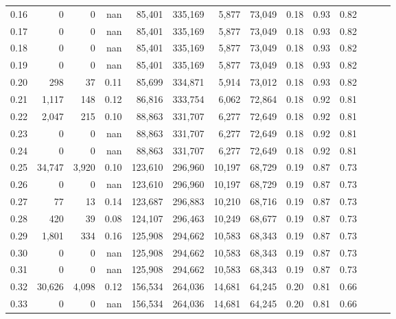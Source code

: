 \begin{tabular}{rrrrrrrrrrrrrr}
0.16 &       0 &      0 &   nan &   85,401 &  335,169 &   5,877 &  73,049 &  0.18 &  0.93 &      0.82 \\
0.17 &       0 &      0 &   nan &   85,401 &  335,169 &   5,877 &  73,049 &  0.18 &  0.93 &      0.82 \\
0.18 &       0 &      0 &   nan &   85,401 &  335,169 &   5,877 &  73,049 &  0.18 &  0.93 &      0.82 \\
0.19 &       0 &      0 &   nan &   85,401 &  335,169 &   5,877 &  73,049 &  0.18 &  0.93 &      0.82 \\
0.20 &     298 &     37 &  0.11 &   85,699 &  334,871 &   5,914 &  73,012 &  0.18 &  0.93 &      0.82 \\
0.21 &   1,117 &    148 &  0.12 &   86,816 &  333,754 &   6,062 &  72,864 &  0.18 &  0.92 &      0.81 \\
0.22 &   2,047 &    215 &  0.10 &   88,863 &  331,707 &   6,277 &  72,649 &  0.18 &  0.92 &      0.81 \\
0.23 &       0 &      0 &   nan &   88,863 &  331,707 &   6,277 &  72,649 &  0.18 &  0.92 &      0.81 \\
0.24 &       0 &      0 &   nan &   88,863 &  331,707 &   6,277 &  72,649 &  0.18 &  0.92 &      0.81 \\
0.25 &  34,747 &  3,920 &  0.10 &  123,610 &  296,960 &  10,197 &  68,729 &  0.19 &  0.87 &      0.73 \\
0.26 &       0 &      0 &   nan &  123,610 &  296,960 &  10,197 &  68,729 &  0.19 &  0.87 &      0.73 \\
0.27 &      77 &     13 &  0.14 &  123,687 &  296,883 &  10,210 &  68,716 &  0.19 &  0.87 &      0.73 \\
0.28 &     420 &     39 &  0.08 &  124,107 &  296,463 &  10,249 &  68,677 &  0.19 &  0.87 &      0.73 \\
0.29 &   1,801 &    334 &  0.16 &  125,908 &  294,662 &  10,583 &  68,343 &  0.19 &  0.87 &      0.73 \\
0.30 &       0 &      0 &   nan &  125,908 &  294,662 &  10,583 &  68,343 &  0.19 &  0.87 &      0.73 \\
0.31 &       0 &      0 &   nan &  125,908 &  294,662 &  10,583 &  68,343 &  0.19 &  0.87 &      0.73 \\
0.32 &  30,626 &  4,098 &  0.12 &  156,534 &  264,036 &  14,681 &  64,245 &  0.20 &  0.81 &      0.66 \\
0.33 &       0 &      0 &   nan &  156,534 &  264,036 &  14,681 &  64,245 &  0.20 &  0.81 &      0.66 \\

\end{tabular}
